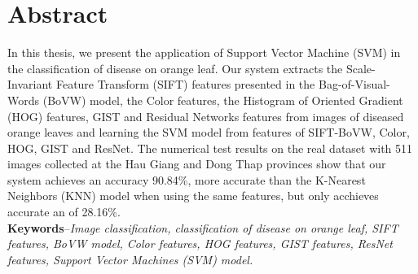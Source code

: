 \chapter*{\Huge Abstract}
In this thesis, we present the application of Support Vector Machine (SVM) in the classification of disease on orange leaf. Our system extracts the Scale-Invariant Feature Transform (SIFT) features presented in the Bag-of-Visual-Words (BoVW) model, the Color features, the Histogram of Oriented Gradient (HOG) features, GIST and Residual Networks features from images of diseased orange leaves and learning the SVM model from features of SIFT-BoVW, Color, HOG, GIST and ResNet. The numerical test results on the real dataset with 511 images collected at the Hau Giang and Dong Thap provinces show that our system achieves an accuracy 90.84\%, more accurate than the K-Nearest Neighbors (KNN) model when using the same features, but only acchieves accurate an of 28.16\%. \\

\noindent \textbf{Keywords}--\emph{Image  classification, classification of disease on orange leaf, SIFT features, BoVW model, Color features, HOG features, GIST features, ResNet features, Support Vector Machines (SVM) model.}